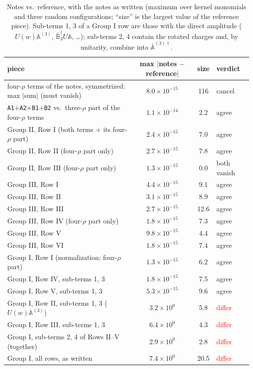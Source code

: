 \documentclass[10pt]{article}
\numberwithin{equation}{section}
\newcommand{\lab}[1]{\texttt{#1}}
\begin{document}
\begin{table}[h]
\centering\small
\begin{tabular}{@{}l c c l@{}}
piece & max $|$notes $-$ reference$|$ & size & verdict\\ \hline
four-$\rho$ terms of the notes, symmetrized: max $|$sum$|$ (must vanish) & $8.0\times10^{-15}$ & 116 & cancel\\
\lab{A1}+\lab{A2}+\lab{B1}+\lab{B2} vs.\ three-$\rho$ part of the four-$\rho$ terms & $1.1\times10^{-14}$ & 2.2 & agree\\
Group II, Row I (both terms + its four-$\rho$ part) & $2.4\times10^{-15}$ & 7.0 & agree\\
Group II, Row II (four-$\rho$ part only) & $2.7\times10^{-15}$ & 7.8 & agree\\
Group II, Row III (four-$\rho$ part only) & $1.3\times10^{-15}$ & 0.0 & both vanish\\
Group III, Row I & $4.4\times10^{-15}$ & 9.1 & agree\\
Group III, Row II & $3.1\times10^{-15}$ & 8.9 & agree\\
Group III, Row III & $2.7\times10^{-15}$ & 12.6 & agree\\
Group III, Row IV (four-$\rho$ part only) & $1.8\times10^{-15}$ & 7.3 & agree\\
Group III, Row V & $9.8\times10^{-15}$ & 4.4 & agree\\
Group III, Row VI & $1.8\times10^{-15}$ & 7.4 & agree\\
Group I, Row I (normalization; four-$\rho$ part) & $1.3\times10^{-15}$ & 6.2 & agree\\
Group I, Row IV, sub-terms 1, 3 & $1.8\times10^{-15}$ & 7.5 & agree\\
Group I, Row V, sub-terms 1, 3 & $5.3\times10^{-15}$ & 9.6 & agree\\
Group I, Row II, sub-terms 1, 3 ($U(w)\mathbb A^{(3)}$) & $3.2\times10^{0}$ & 5.8 & \textcolor{red}{differ}\\
Group I, Row III, sub-terms 1, 3 & $6.4\times10^{0}$ & 4.3 & \textcolor{red}{differ}\\
Group I, sub-terms 2, 4 of Rows II--V (together) & $2.9\times10^{0}$ & 2.8 & \textcolor{red}{differ}\\
Group I, all rows, as written & $7.4\times10^{0}$ & 20.5 & \textcolor{red}{differ}\\
\end{tabular}
\caption{Notes vs.\ reference, with the notes as written (maximum over kernel monomials and three random configurations; ``size'' is the largest value of the reference piece). Sub-terms 1, 3 of a Group I row are those with the direct amplitude ($U(w)\mathbb A^{(3)}$, $\bar{\mathbb B}_3^\dagger U\mathbb A$, \dots); sub-terms 2, 4 contain the rotated charges and, by unitarity, combine into $\bar{\mathbb A}^{(3)\dagger}$.}
\label{tab:reference}
\end{table}
\end{document}
